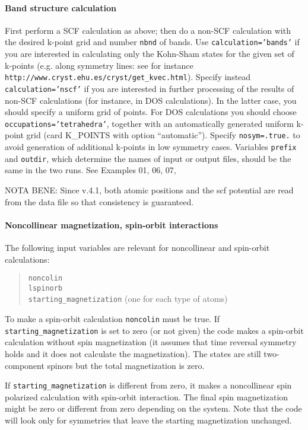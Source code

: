 \documentclass[12pt,a4paper]{article}
\begin{document}
\paragraph{Band structure calculation}
First perform a SCF calculation as above;
then do a non-SCF calculation with the desired k-point grid and 
number \texttt{nbnd} of bands. 
Use \texttt{calculation='bands'} if you are interested in calculating
only the Kohn-Sham states for the given set of k-points
(e.g. along symmetry lines: see for instance
\texttt{http://www.cryst.ehu.es/cryst/get\_kvec.html}). Specify instead
\texttt{calculation='nscf'} if you are interested in further processing 
of the results of non-SCF calculations (for instance, in DOS calculations).
In the latter case, you should specify a uniform grid of points.
For DOS calculations you should choose \texttt{occupations='tetrahedra'}, 
together with an automatically generated uniform k-point grid 
(card K\_POINTS with option ``automatic'').
Specify \texttt{nosym=.true.} to avoid generation of additional k-points in
low symmetry cases. Variables \texttt{prefix} and \texttt{outdir}, which determine
the names of input or output files, should be the same in the two runs.
See Examples 01, 06, 07,

NOTA BENE:  Since v.4.1, both atomic positions
and the scf
potential are read from the data file so that consistency is guaranteed.

\paragraph{Noncollinear magnetization, spin-orbit interactions}

The following input variables are relevant for noncollinear and
spin-orbit calculations: 
\begin{quote}
      \texttt{noncolin}\\
      \texttt{lspinorb}\\
      \texttt{starting\_magnetization} (one for each type of atoms)
\end{quote}
To make a spin-orbit calculation \texttt{noncolin} must be true. 
If \texttt{starting\_magnetization} is set to zero (or not given) 
the code makes a spin-orbit calculation without spin magnetization 
(it assumes that time reversal symmetry holds and it does not calculate 
the magnetization). The states are still two-component spinors but the
total magnetization is zero. 

If \texttt{starting\_magnetization} is different from zero, it makes a 
noncollinear spin polarized calculation with spin-orbit interaction. The 
final spin magnetization might be zero or different from zero depending 
on the system. Note that the code will look only for symmetries that leave
the starting magnetization unchanged.
\end{document}
